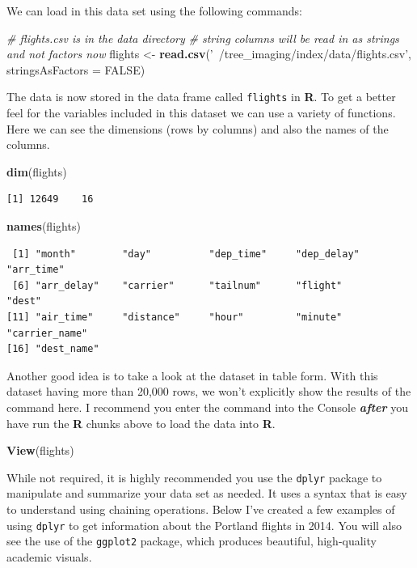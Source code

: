 \documentclass[12pt,twoside]{reedthesis}
\newenvironment{Shaded}{\begin{snugshade}}{\end{snugshade}}
\newcommand{\CommentTok}[1]{\textcolor[rgb]{0.56,0.35,0.01}{\textit{#1}}}
\newcommand{\DataTypeTok}[1]{\textcolor[rgb]{0.13,0.29,0.53}{#1}}
\newcommand{\KeywordTok}[1]{\textcolor[rgb]{0.13,0.29,0.53}{\textbf{#1}}}
\newcommand{\NormalTok}[1]{#1}
\newcommand{\OtherTok}[1]{\textcolor[rgb]{0.56,0.35,0.01}{#1}}
\newcommand{\StringTok}[1]{\textcolor[rgb]{0.31,0.60,0.02}{#1}}
\begin{document}
We can load in this data set using the following commands:
\begin{Shaded}
\begin{Highlighting}[]
\CommentTok{# flights.csv is in the data directory}
\CommentTok{# string columns will be read in as strings and not factors now}
\NormalTok{flights <-}\StringTok{ }\KeywordTok{read.csv}\NormalTok{(}\StringTok{'~/tree_imaging/index/data/flights.csv'}\NormalTok{, }\DataTypeTok{stringsAsFactors =} \OtherTok{FALSE}\NormalTok{)}
\end{Highlighting}
\end{Shaded}
The data is now stored in the data frame called \texttt{flights} in \textbf{R}. To get a better feel for the variables included in this dataset we can use a variety of functions. Here we can see the dimensions (rows by columns) and also the names of the columns.
\begin{Shaded}
\begin{Highlighting}[]
\KeywordTok{dim}\NormalTok{(flights)}
\end{Highlighting}
\end{Shaded}
\begin{verbatim}
[1] 12649    16
\end{verbatim}
\begin{Shaded}
\begin{Highlighting}[]
\KeywordTok{names}\NormalTok{(flights)}
\end{Highlighting}
\end{Shaded}
\begin{verbatim}
 [1] "month"        "day"          "dep_time"     "dep_delay"    "arr_time"    
 [6] "arr_delay"    "carrier"      "tailnum"      "flight"       "dest"        
[11] "air_time"     "distance"     "hour"         "minute"       "carrier_name"
[16] "dest_name"   
\end{verbatim}
Another good idea is to take a look at the dataset in table form. With this dataset having more than 20,000 rows, we won't explicitly show the results of the command here. I recommend you enter the command into the Console \textbf{\emph{after}} you have run the \textbf{R} chunks above to load the data into \textbf{R}.
\begin{Shaded}
\begin{Highlighting}[]
\KeywordTok{View}\NormalTok{(flights)}
\end{Highlighting}
\end{Shaded}
While not required, it is highly recommended you use the \texttt{dplyr} package to manipulate and summarize your data set as needed. It uses a syntax that is easy to understand using chaining operations. Below I've created a few examples of using \texttt{dplyr} to get information about the Portland flights in 2014. You will also see the use of the \texttt{ggplot2} package, which produces beautiful, high-quality academic visuals.
\end{document}
